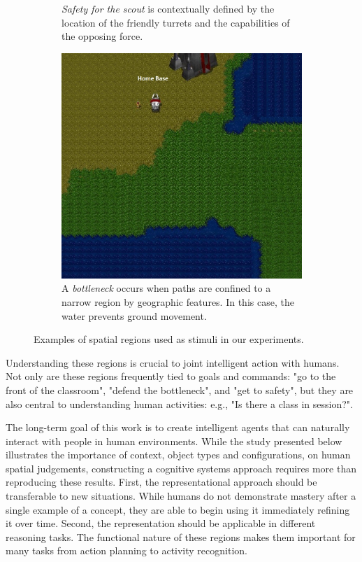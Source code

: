 \documentclass[11pt,letterpaper]{article}
\begin{document}
\begin{figure}
\begin{subfigure}[b]{0.3\textwidth}
  \caption{\textit{Safety for the scout} is contextually defined by the location of the friendly turrets and the capabilities of the opposing force.}
\end{subfigure}
\begin{subfigure}[b]{0.3\textwidth}
  \includegraphics[width=\textwidth]{figures/bottleneck.JPG}
  \caption{A \textit{bottleneck} occurs when paths are confined to a narrow region by geographic features.  In this case, the water prevents ground movement.}
  \label{fig:safety}
  \end{subfigure}
  
  \caption{Examples of spatial regions used as stimuli in our experiments.}
  \label{fig:examples}
\end{figure}

Understanding these regions is crucial to joint intelligent action with humans.  Not only are these regions frequently tied to goals and commands: "go to the front of the classroom", "defend the bottleneck", and "get to safety", but they are also central to understanding human activities: e.g., "Is there a class in session?".

The long-term goal of this work is to create intelligent agents that can naturally interact with people in human environments.  While the study presented below illustrates the importance of context, object types and configurations, on human spatial judgements, constructing a cognitive systems approach requires more than reproducing these results.  First, the representational approach should be transferable to new situations.  While humans do not demonstrate mastery after a single example of a concept, they are able to begin using it immediately refining it over time.  Second, the representation should be applicable in different reasoning tasks.  The functional nature of these regions makes them important for many tasks from action planning to activity recognition.
\end{document}
